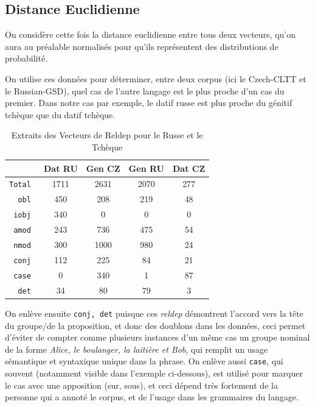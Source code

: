 \documentclass{cours}
\begin{document}
\subsection{Distance Euclidienne}\label{subsec:l2}
On considère cette fois la distance euclidienne entre tous deux vecteurs, qu'on aura au préalable normalisés pour qu'ils représentent des distributions de probabilité.



On utilise ces données pour déterminer, entre deux corpus (ici le Czech-CLTT et le Russian-GSD), quel cas de l'autre langage est le plus proche d'un cas du premier.
Dans notre cas par exemple, le datif russe est plus proche du génitif tchèque que du datif tchèque.

\begin{table}[H]
	\centering
	\begin{tabular}{>{\tt}r|cccc}
		\toprule
		&Dat RU & Gen CZ & Gen RU & Dat CZ\\
		\midrule
		Total & 1711 & 2631 & 2070 & 277\\
		\midrule
		obl & 450 & 208 & 219 & 48\\
		iobj & 340 & 0 & 0 & 0\\
		amod & 243 & 736 & 475 & 54\\
		nmod & 300 & 1000 & 980 & 24\\
		conj & 112 & 225 & 84 & 21\\
		case & 0 & 340 & 1 & 87\\
		det & 34 & 80 & 79 & 3\\
		\bottomrule
	\end{tabular}
	\caption{Extraits des Vecteurs de Reldep pour le Russe et le Tchèque}
\end{table}

On enlève ensuite \texttt{conj, det} puisque ces \textit{reldep} démontrent l'accord vers la tête du groupe/de la proposition, et donc des doublons dans les données, ceci permet d'éviter de compter comme plusieurs instances d'un même cas un groupe nominal de la forme \emph{Alice, le boulanger, la laitière et Bob}, qui remplit un usage sémantique et syntaxique unique dans la phrase.
On enlève aussi \texttt{case}, qui souvent (notamment visible dans l'exemple ci-dessous), est utilisé pour marquer le cas avec une apposition (sur, sous), et ceci dépend très fortement de la personne qui a annoté le corpus, et de l'usage dans les grammaires du langage.\\
\medskip
\end{document}
